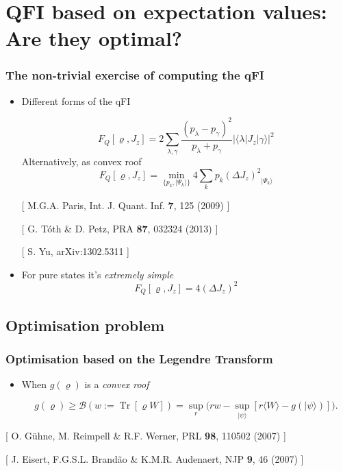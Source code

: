 \documentclass{beamer}
\DeclareMathOperator{\Tr}{Tr}
\newcommand{\ket}[1]{\ensuremath{\vert #1 \rangle}}
\newcommand{\braOket}[3]{\ensuremath{\langle #1 \vert #2 \vert #3 \rangle}}
\newcommand{\expect}[1]{\ensuremath{\langle #1 \rangle}}
\newcommand{\varian}[1]{\ensuremath{\left(\Delta #1 \right)^2}}
\newcommand{\tr}[1]{\ensuremath{\Tr \lcua #1\rcua}}
\newcommand{\citate}[1]{{\footnotesize{\color{gray}[ #1 ]}}

	}
\def\lcua{\left[}
\def\rcua{\right]}
\begin{document}
\section[QFI based on expectation values]{QFI based on expectation values: Are they optimal?}

	\begin{frame}
		\tableofcontents[currentsection]

	\end{frame}

	\begin{frame}
		\frametitle{The non-trivial exercise of computing the qFI}

		\begin{itemize}
			\item<1-> Different forms of the qFI
				\begin{block}
					{}
					\small
					\[
						F_Q[\varrho,J_z]=2 \sum_{\lambda,\gamma} \frac{(p_\lambda-p_\gamma)^2}{p_\lambda+p_\gamma} |\braOket{\lambda}{J_z}{\gamma}|^2
					\]
					\hspace{10px}Alternatively, as convex roof
					\[
					  F_Q[\varrho,J_z]=\min_{\{p_k,\ket{\Psi_k}\}} 4\sum_k p_k \varian{J_z}_{\ket{\Psi_k}}
					\]
				\end{block}
				\citate{M.G.A. Paris, Int. J. Quant. Inf. \textbf{7}, 125 (2009)}
				\citate{G. T\'oth \& D. Petz, PRA \textbf{87}, 032324 (2013)}
				\citate{S. Yu, arXiv:1302.5311}
				\vspace{2px}

			\item<2-> For pure states it's \emph{\color{blue}extremely simple}
				{\small
				\[
					F_Q[\varrho,J_z] = 4\varian{J_z}
				\]
				}

		\end{itemize}

	\end{frame}

	\subsection{Optimisation problem}

		\begin{frame}
			\frametitle{Optimisation based on the Legendre Transform}
			\begin{itemize}
				\item When $g(\varrho)$ is a \emph{\color{blue} convex roof}
					\begin{block}
						{}
						{\small
						\vspace{8px}
						\[
						g(\varrho)\geq\mathcal{B}(w:=\tr{\varrho W}) = \sup_{r} \big( r w - \sup_{\ket{\psi}} [ r\expect{W} - g(\ket{\psi}) ] \big).
						\]}
					\end{block}
			\end{itemize}

			\citate{O. G\"uhne, M. Reimpell \& R.F. Werner, PRL \textbf{98}, 110502 (2007)}
			\citate{J. Eisert, F.G.S.L. Brand\~ao \& K.M.R. Audenaert, NJP \textbf{9}, 46 (2007)}
		\end{frame}
\end{document}
